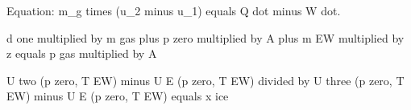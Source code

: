 Equation:  
m_g times (u_2 minus u_1) equals Q dot minus W dot.

d one multiplied by m gas plus p zero multiplied by A plus m EW multiplied by z equals p gas multiplied by A  

U two (p zero, T EW) minus U E (p zero, T EW) divided by U three (p zero, T EW) minus U E (p zero, T EW) equals x ice